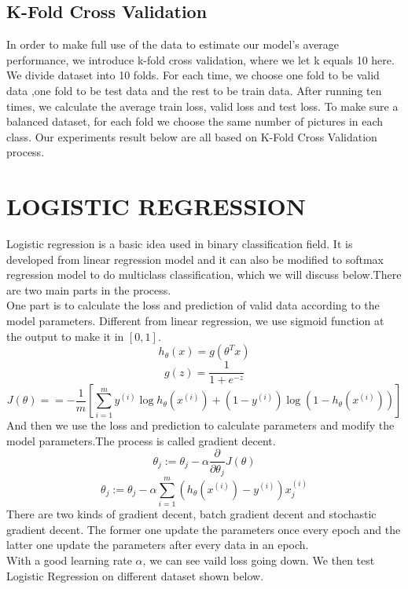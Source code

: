 \documentclass{article} %
\begin{document}
\subsection {K-Fold Cross Validation}
In order to make full use of the data to estimate our model’s average performance, we introduce k-fold cross validation, where we let k equals 10 here. We divide dataset into 10 folds. For each time, we choose one fold to be valid data ,one fold to be test data and the rest to be train data. After running ten times, we calculate the average train loss, valid loss and test loss. To make sure a balanced dataset, for each fold we choose the same number of pictures in each class. Our experiments result below are all based on K-Fold Cross Validation process. 

\section{LOGISTIC REGRESSION}
Logistic regression is a basic idea used in binary classification field. It is developed from linear regression model and it can also be modified to softmax regression model to do multiclass classification, which we will discuss below.There are two main parts in the process. \\
One part is to calculate the loss and prediction of valid data according to the model parameters. Different from linear regression, we use sigmoid function at the output to make it in $[0,1]$. 
$$h_{\theta}(x)=g\left(\theta^{T} x\right)$$
$$g(z)=\frac{1}{1+e^{-z}}$$
$$ J(\theta) = =-\frac{1}{m}\left[\sum_{i=1}^{m} y^{(i)} \log h_{\theta}\left(x^{(i)}\right)+\left(1-y^{(i)}\right) \log \left(1-h_{\theta}\left(x^{(i)}\right)\right)\right]$$
And then we use the loss and prediction to calculate parameters and modify the model parameters.The process is called gradient decent.
$$\theta_{j}:=\theta_{j}-\alpha \frac{\partial}{\partial \theta_{j}} J(\theta)$$
$$\theta_{j}:=\theta_{j}-\alpha \sum_{i=1}^{m}\left(h_{\theta}\left(x^{(i)}\right)-y^{(i)}\right) x_{j}^{(i)}$$
There are two kinds of gradient decent, batch gradient decent and stochastic gradient decent. The former one update the parameters once every epoch and the latter one update the parameters after every data in an epoch.\\
With a good learning rate $\alpha$, we can see vaild loss going down. We then test Logistic Regression on different dataset shown below.
\end{document}
